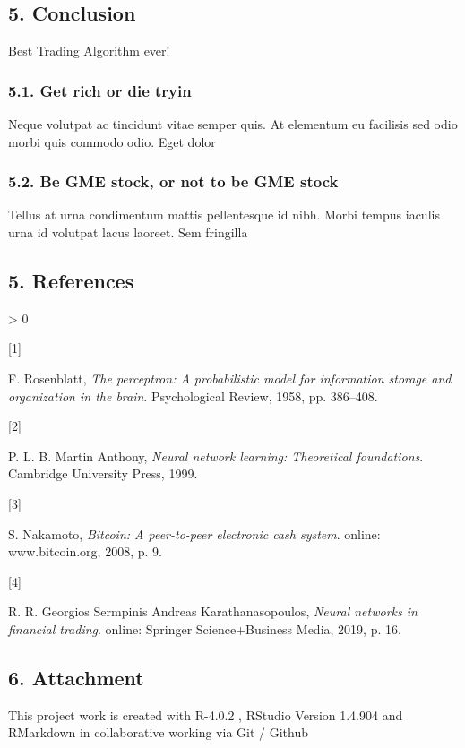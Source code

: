 \documentclass[
]{article}
\newlength{\cslhangindent}
\newlength{\csllabelwidth}
\newenvironment{CSLReferences}[2] %
 {%
  \setlength{\parindent}{0pt}
  \ifodd #1 \everypar{\setlength{\hangindent}{\cslhangindent}}\ignorespaces\fi
  \ifnum #2 > 0
  \setlength{\parskip}{#2\baselineskip}
  \fi
 }%
 {}
\newcommand{\CSLLeftMargin}[1]{\parbox[t]{\csllabelwidth}{#1}}
\newcommand{\CSLRightInline}[1]{\parbox[t]{\linewidth - \csllabelwidth}{#1}\break}
\begin{document}
\newpage

\hypertarget{conclusion}{%
\subsection{5. Conclusion}\label{conclusion}}

Best Trading Algorithm ever!

\hypertarget{get-rich-or-die-tryin}{%
\subsubsection{5.1. Get rich or die tryin}\label{get-rich-or-die-tryin}}

Neque volutpat ac tincidunt vitae semper quis. At elementum eu facilisis
sed odio morbi quis commodo odio. Eget dolor

\hypertarget{be-gme-stock-or-not-to-be-gme-stock}{%
\subsubsection{5.2. Be GME stock, or not to be GME
stock}\label{be-gme-stock-or-not-to-be-gme-stock}}

Tellus at urna condimentum mattis pellentesque id nibh. Morbi tempus
iaculis urna id volutpat lacus laoreet. Sem fringilla

\newpage

\hypertarget{references}{%
\subsection{5. References}\label{references}}

\hypertarget{refs}{}
\begin{CSLReferences}{0}{0}
\leavevmode\hypertarget{ref-perceptron_paper}{}%
\CSLLeftMargin{{[}1{]} }
\CSLRightInline{F. Rosenblatt, \emph{The perceptron: A probabilistic
model for information storage and organization in the brain}.
Psychological Review, 1958, pp. 386--408.}

\leavevmode\hypertarget{ref-nn_learning_theoretical_foundations}{}%
\CSLLeftMargin{{[}2{]} }
\CSLRightInline{P. L. B. Martin Anthony, \emph{Neural network learning:
Theoretical foundations}. Cambridge University Press, 1999.}

\leavevmode\hypertarget{ref-bitcoin}{}%
\CSLLeftMargin{{[}3{]} }
\CSLRightInline{S. Nakamoto, \emph{Bitcoin: A peer-to-peer electronic
cash system}. online: www.bitcoin.org, 2008, p. 9.}

\leavevmode\hypertarget{ref-nnfin}{}%
\CSLLeftMargin{{[}4{]} }
\CSLRightInline{R. R. Georgios Sermpinis Andreas Karathanasopoulos,
\emph{Neural networks in financial trading}. online: Springer
Science+Business Media, 2019, p. 16.}

\end{CSLReferences}

\newpage

\hypertarget{attachment}{%
\subsection{6. Attachment}\label{attachment}}

This project work is created with R-4.0.2 , RStudio Version 1.4.904 and
RMarkdown in collaborative working via Git / Github
\end{document}
